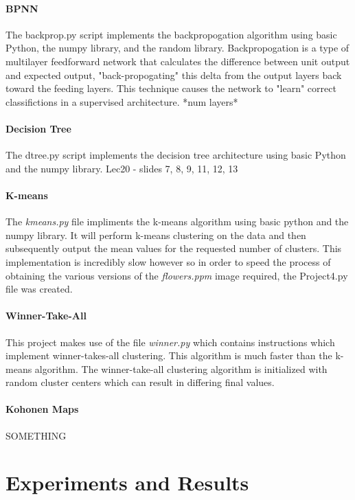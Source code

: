 \documentclass{article}
\begin{document}
\paragraph{BPNN} 
The backprop.py script implements the backpropogation algorithm using basic Python, the numpy
library, and the random library.  Backpropogation is a type of multilayer feedforward network
that calculates the difference between unit output and expected output, "back-propogating"
this delta from the output layers back toward the feeding layers.  This technique causes the
network to "learn" correct classifictions in a supervised architecture.
*num layers*

\paragraph{Decision Tree} 
The dtree.py script implements the decision tree architecture using basic Python and the numpy
library.  Lec20 - slides 7, 8, 9, 11, 12, 13

\paragraph{K-means} 
The \textit{kmeans.py} file impliments the k-means algorithm using basic
python and the numpy library. It will perform k-means clustering on the 
data and then subsequently output the mean values for the requested number
of clusters. This implementation is incredibly slow however so in order to
speed the process of obtaining the various versions of the \textit{flowers.ppm}
image required, the Project4.py file was created. 

\paragraph{Winner-Take-All}
This project makes use of the file \textit{winner.py} which contains instructions
which implement winner-takes-all clustering. This algorithm is much faster than the
k-means algorithm. The winner-take-all clustering algorithm is initialized with random
cluster centers which can result in differing final values.

\paragraph{Kohonen Maps}
SOMETHING


\newpage
\section*{Experiments and Results}
\end{document}

